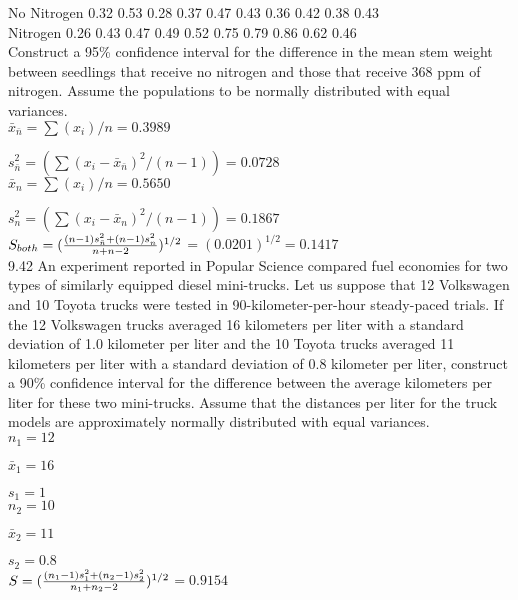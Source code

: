 No Nitrogen
0.32
0.53
0.28
0.37
0.47
0.43
0.36
0.42
0.38
0.43 \\

Nitrogen
0.26
0.43
0.47
0.49
0.52
0.75
0.79
0.86
0.62
0.46 \\

Construct a 95\% confidence interval for the difference in the mean stem weight between seedlings that receive no nitrogen and those that receive 368 ppm of nitrogen. Assume the populations to be normally distributed with equal variances. \\



$\bar{x}_{\bar{n}} = \sum(x_i)/n = 0.3989$ 

$s^2_{\bar{n}} = (\sum(x_i - \bar{x}_{\bar{n}})^2/(n-1)) = 0.0728$ \\


$\bar{x}_{n} = \sum(x_i)/n = 0.5650$ 

$s^2_{n} = (\sum(x_i - \bar{x}_{n})^2/(n-1)) = 0.1867$ \\

$S_{both} = (\frac{(n - 1)s^2_{\bar{n}} + (n - 1)s^2_{n}}{n + n - 2})^{1/2}$$= (0.0201)^{1/2} = 0.1417$ \\


9.42 An experiment reported in Popular Science compared fuel economies for two types of similarly equipped diesel mini-trucks. Let us suppose that 12 Volkswagen and 10 Toyota trucks were tested in 90-kilometer-per-hour steady-paced trials. If the 12 Volkswagen trucks averaged 16 kilometers per liter with a standard deviation of 1.0 kilometer per liter and the 10 Toyota trucks averaged 11 kilometers per liter with a standard deviation of 0.8 kilometer per liter, construct a 90\% confidence interval for the difference between the average kilometers per liter for these two mini-trucks. Assume that the distances per liter for the truck models are approximately normally distributed with equal variances. \\

$n_1 = 12$

$\bar{x}_1 = 16$

$s_1 = 1$ \\

$n_2 = 10$

$\bar{x}_2 = 11$

$s_2 = 0.8$ \\

$S = (\frac{(n_1 - 1)s^2_{1} + (n_2 - 1)s^2_{2}}{n_1 + n_2 - 2})^{1/2}$$= 0.9154$ \\

